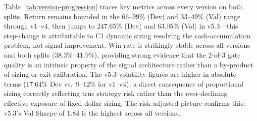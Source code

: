 \documentclass[11pt,twoside,a4paper]{article}
\begin{document}
Table~\ref{tab:version-progression} traces key metrics across every version on both splits. Return remains bounded in the 66--99\% (Dev) and 33--49\% (Val) range through v1--v4, then jumps to 247.65\% (Dev) and 63.05\% (Val) in v5.3---this step-change is attributable to C1 dynamic sizing resolving the cash-accumulation problem, not signal improvement. Win rate is strikingly stable across all versions and both splits (38.3\%--41.9\%), providing strong evidence that the 2-of-3 gate quality is an intrinsic property of the signal architecture rather than a by-product of sizing or exit calibration. The v5.3 volatility figures are higher in absolute terms (17.64\% Dev vs.\ 9--12\% for v1--v4), a direct consequence of proportional sizing correctly reflecting true strategy risk rather than the ever-declining effective exposure of fixed-dollar sizing. The risk-adjusted picture confirms this: v5.3's Val Sharpe of 1.84 is the highest across all versions.

\begin{table}[H]
\centering
\caption{Performance metrics across all strategy versions (Dev and Val splits). v5 refers to v5.3, the final WFO-calibrated implementation.}
\label{tab:version-progression}
\end{table}
\end{document}
